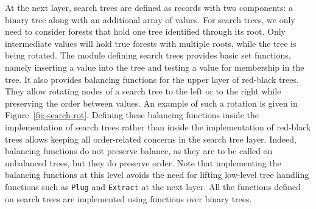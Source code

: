 \documentclass{llncs}
\begin{document}

At the next layer, search trees are defined as records with two components:
a binary tree along with an additional array of values.
For search trees, we only need to consider forests
that hold one tree identified through its root. Only intermediate values
will hold true forests with multiple roots, while the tree is being rotated.
The module defining search trees provides basic set functions, namely
inserting a value into the tree and testing a value for membership in the
tree. It also provides balancing functions for the upper layer of red-black
trees. They allow rotating nodes of a search tree to the left or to the right
while preserving the order between values. An example of such a rotation is
given in Figure~\ref{fig-search-rot}.  Defining these balancing functions
inside the implementation of search trees rather than inside the implementation
of red-black trees allows keeping all order-related concerns in the search tree
layer. Indeed, balancing functions do not preserve balance, as they are to be
called on unbalanced trees, but they do preserve order. Note that implementing
the balancing functions at this level avoids the need for lifting low-level
tree handling functions such as \texttt{Plug} and \texttt{Extract} at the next
layer. All the functions defined on search trees are implemented using
functions over binary trees.



\end{document}
